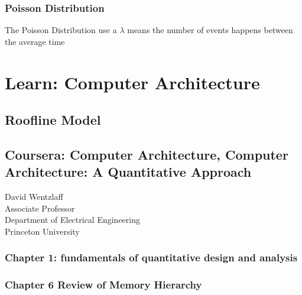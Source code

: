 \documentclass[UTF8]{article}
\begin{document}
\subsubsection{Poisson Distribution}
The Poisson Distribution use a $\lambda$ means the number of events happens between the average time 
\section{Learn: Computer Architecture}
\subsection{Roofline Model}
\subsection{Coursera: Computer Architecture, Computer Architecture: A Quantitative Approach}
David Wentzlaff\\
Associate Professor\\
Department of Electrical Engineering\\
Princeton University\\

\subsubsection{Chapter 1: fundamentals of quantitative design and analysis}
\subsubsection{Chapter 6 Review of Memory Hierarchy}
\end{document}
